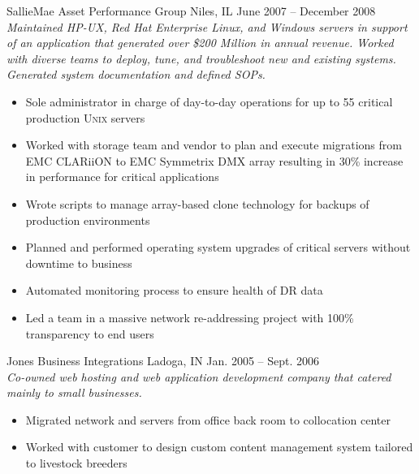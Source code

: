 \documentclass[9pt]{extarticle} %
\begin{document}
\begin{minipage}[c]{\textwidth}

	\begin{indented}
		SallieMae Asset Performance Group \tab Niles, IL \tab June 2007 -- December 2008\\
		\textit{Maintained HP-UX, Red Hat Enterprise Linux, and Windows servers in support of an application that generated over \$200 Million in annual revenue. Worked with diverse teams to deploy, tune, and troubleshoot new and existing systems. Generated system documentation and defined SOPs.}
		\begin{itemize}
			\item Sole administrator in charge of day-to-day operations for up to 55 critical production \textsc{Unix} servers
			\item Worked with storage team and vendor to plan and execute migrations from EMC CLARiiON to EMC Symmetrix DMX array resulting in 30\% increase in performance for critical applications
			\item Wrote scripts to manage array-based clone technology for backups of production environments
			\item Planned and performed operating system upgrades of critical servers without downtime to business
			\item Automated monitoring process to ensure health of DR data
			\item Led a team in a massive network re-addressing project with 100\% transparency to end users
		\end{itemize}
	\end{indented}
\end{minipage}

\bigskip


\begin{minipage}[c]{\textwidth}
	\jobtitle{Co-Owner}

	\begin{indented}
		Jones Business Integrations \tab Ladoga, IN \tab Jan. 2005 -- Sept. 2006\\
		\textit{Co-owned web hosting and web application development company that catered mainly to small businesses.}
		\begin{itemize}
			\item Migrated network and servers from office back room to collocation center
			\item Worked with customer to design custom content management system tailored to livestock breeders
		\end{itemize}
	\end{indented}
\end{minipage}
\end{document}
